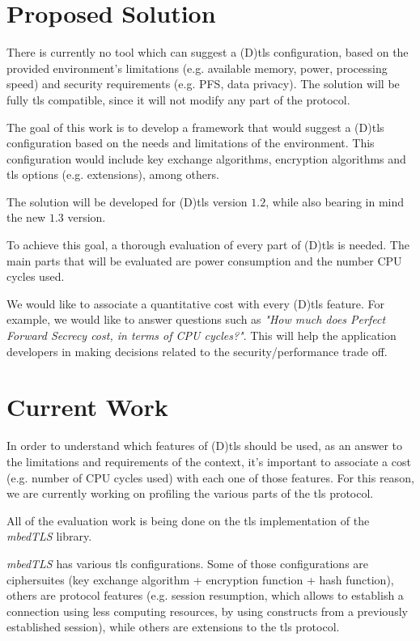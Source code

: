 \documentclass[conference]{IEEEtran}
\begin{document}
\section{Proposed Solution}

There is currently
no tool which can suggest a (D)\gls{tls} configuration, based
on the provided environment's limitations (e.g. available
memory, power, processing speed) and security requirements (e.g. PFS, data privacy). The solution will be fully \gls{tls} compatible,
since it will not modify any part of the protocol.

The goal of this work is to develop a framework that would
suggest a (D)\gls{tls} configuration based on the needs and
limitations of the environment. This configuration would
include key exchange algorithms, encryption algorithms
and \gls{tls} options (e.g. extensions), among others.

The solution will be developed for
(D)\gls{tls} version $1.2$, while also bearing in mind the new $1.3$ version.

To achieve this goal, a thorough evaluation of every part of (D)\gls{tls} is
needed. The main parts that will be evaluated are power consumption and the number CPU cycles used.

We would like to associate a quantitative
cost with every (D)\gls{tls} feature. For example, we would like to answer
questions such as \textit{"How much does Perfect Forward Secrecy cost, in terms of CPU cycles?"}.
This will help the application developers in making decisions related
to the security/performance trade off.

\section{Current Work}

In order to understand which features of (D)\gls{tls} should be
used, as an answer to the limitations and requirements of the context,
it's important to associate a cost (e.g. number of CPU cycles used) with each one of those features.
For this reason, we are currently working on profiling the various parts of the \gls{tls} protocol.

All of the evaluation work is being done on the \gls{tls} implementation of the \textit{mbedTLS} library\cite{SSLLibra13:online}.

\textit{mbedTLS} has various \gls{tls} configurations. Some of those
configurations are ciphersuites (key exchange algorithm + encryption function + hash function), others are protocol features (e.g.
session resumption, which allows to establish a connection using
less computing resources, by using constructs from a previously
established session), while others are extensions to the \gls{tls} protocol.
\end{document}
